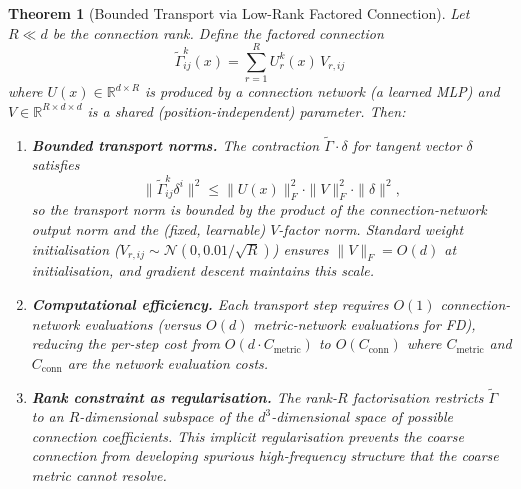 \documentclass[11pt,letterpaper]{article}
\newtheorem{theorem}[conjecture]{Theorem}
\begin{document}
\begin{theorem}[Bounded Transport via Low-Rank Factored 
Connection]\label{thm:lowrank_connection}
Let $R \ll d$ be the \emph{connection rank}. Define the factored 
connection
\begin{equation}\label{eq:lowrank_gamma}
    \tilde{\Gamma}^k_{ij}(x) = \sum_{r=1}^{R} U^k_r(x) \, 
    V_{r,ij}
\end{equation}
where $U(x) \in \mathbb{R}^{d \times R}$ is produced by a 
\emph{connection network} (a learned MLP) and 
$V \in \mathbb{R}^{R \times d \times d}$ is a shared 
(position-independent) parameter. Then:
\begin{enumerate}
    \item \textbf{Bounded transport norms.} The contraction 
    $\tilde{\Gamma} \cdot \delta$ for tangent vector $\delta$ 
    satisfies
    \begin{equation}\label{eq:transport_bound}
        \|\tilde{\Gamma}^k_{ij} \delta^i\|^2 \leq 
        \|U(x)\|_F^2 \cdot \|V\|_F^2 \cdot \|\delta\|^2,
    \end{equation}
    so the transport norm is bounded by the product of the 
    connection-network output norm and the (fixed, learnable) 
    $V$-factor norm. Standard weight initialisation 
    ($V_{r,ij} \sim \mathcal{N}(0, 0.01/\sqrt{R})$) ensures 
    $\|V\|_F = O(d)$ at initialisation, and gradient descent 
    maintains this scale.
    
    \item \textbf{Computational efficiency.} Each transport step 
    requires $O(1)$ connection-network evaluations (versus $O(d)$ 
    metric-network evaluations for FD), reducing the per-step 
    cost from $O(d \cdot C_{\mathrm{metric}})$ to 
    $O(C_{\mathrm{conn}})$ where $C_{\mathrm{metric}}$ and 
    $C_{\mathrm{conn}}$ are the network evaluation costs.
    
    \item \textbf{Rank constraint as regularisation.} The rank-$R$ 
    factorisation restricts $\tilde{\Gamma}$ to an 
    $R$-dimensional subspace of the $d^3$-dimensional space of 
    possible connection coefficients. This implicit regularisation 
    prevents the coarse connection from developing spurious 
    high-frequency structure that the coarse metric cannot resolve.
\end{enumerate}
\end{theorem}
\end{document}
